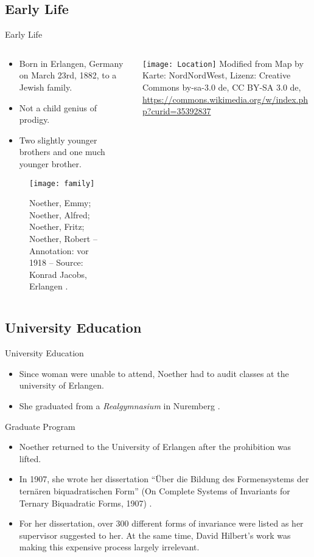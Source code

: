 \documentclass[10pt]{beamer}
\begin{document}
\subsection{Early Life}
\begin{frame}{Early Life}
\begin{columns}
\begin{column}{0.6\textwidth}
\begin{itemize}
\item Born in Erlangen, Germany on March 23rd, 1882, to a Jewish family.
\item Not a child genius of prodigy.
\item Two slightly younger brothers and one much younger brother.
\end{itemize}
\begin{figure}[h]
    \centering
    \texttt{[image: family]}
    \caption{Noether, Emmy; Noether, Alfred; Noether, Fritz; Noether, Robert --
Annotation: vor 1918 -- Source: Konrad Jacobs, Erlangen \cite{wikipedia}. }
\end{figure}
\end{column}
\begin{column}{0.4\textwidth}

\texttt{[image: Location]}
\scriptsize Modified from Map by Karte: NordNordWest, Lizenz: Creative Commons by-sa-3.0 de, CC BY-SA 3.0 de, \url{https://commons.wikimedia.org/w/index.php?curid=35392837}
\end{column}
\end{columns}
\end{frame}

\subsection{University Education}
\begin{frame}{University Education}
\begin{itemize}
\item Since woman were unable to attend, Noether had to audit classes at the
university of Erlangen.
\item She graduated from a \textit{Realgymnasium} in Nuremberg \cite{wikipedia}.
\end{itemize}
\begin{block}{Graduate Program}
\begin{itemize}
\item Noether returned to the University of Erlangen after the prohibition was lifted.
\item In 1907, she wrote her dissertation ``\"Uber die Bildung des Formensystems
der tern\"aren biquadratischen Form'' (On Complete Systems of Invariants for Ternary Biquadratic Forms, 1907) \cite{biography}.
\item For her dissertation, over \(300\) different forms of invariance were
listed as her supervisor suggested to her. At the same time, David Hilbert's
work was making this expensive process largely irrelevant.
\end{itemize}
\end{block}
\end{frame}
\end{document}
